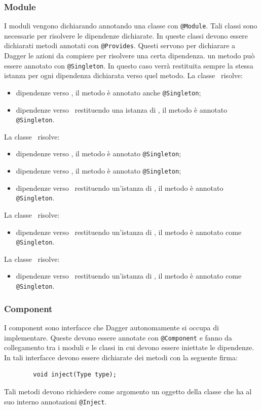 \documentclass[../ManualeSviluppatore.tex]{subfiles}
\begin{document}
	\subsubsection{Module}
	I moduli vengono dichiarando annotando una classe con \lstinline|@Module|. Tali classi sono necessarie per risolvere le dipendenze dichiarate. In queste classi devono essere dichiarati metodi annotati con \lstinline|@Provides|. Questi servono per dichiarare a Dagger le azioni da compiere per risolvere una certa dipendenza. un metodo può essere annotato con \lstinline|@Singleton|. In questo caso verrà restituita sempre la stessa istanza per ogni dipendenza dichiarata verso quel metodo. 
	La classe \AppModule\ risolve:
	\begin{itemize}
		\item dipendenze verso \Context, il metodo è annotato anche \lstinline|@Singleton|;
		\item dipendenze verso \Application\ restituendo una istanza di \MyApplication, il metodo è annotato \lstinline|@Singleton|.
	\end{itemize}
	La classe \DatabaseModule\ risolve:
	\begin{itemize}
		\item dipendenze verso \SQLiteDaoFactory, il metodo è annotato  \lstinline|@Singleton|;
		\item dipendenze verso \RemoteDaoFactory, il metodo è annotato  \lstinline|@Singleton|;
		\item dipendenze verso \DatabaseAccess\ restituendo un'istanza di \BuildingAccess, il metodo è annotato \lstinline|@Singleton|.
	\end{itemize}
	La classe \InfoModule\ risolve:
	\begin{itemize}
		\item dipendenze verso \InformationManager\ restituendo un'istanza di \InformationManagerImp, il metodo è annotato come \lstinline|@Singleton|.
	\end{itemize}
	La classe \SettingModule\ risolve:
	\begin{itemize}
		\item dipendenze verso \Setting\ restituendo un'istanza di \SettingImp, il metodo è annotato come \lstinline|@Singleton|.
	\end{itemize}

	\subsubsection{Component}
	I component sono interfacce che Dagger autonomamente si occupa di implementare. Queste devono essere annotate con \lstinline|@Component| e fanno da collegamento tra i moduli e le classi in cui devono essere iniettate le dipendenze. In tali interfacce devono essere dichiarate dei metodi con la seguente firma:
	\begin{lstlisting}
		void inject(Type type);
	\end{lstlisting}
	Tali metodi devono richiedere come argomento un oggetto della classe che ha al suo interno annotazioni \lstinline|@Inject|.
	
\end{document}
